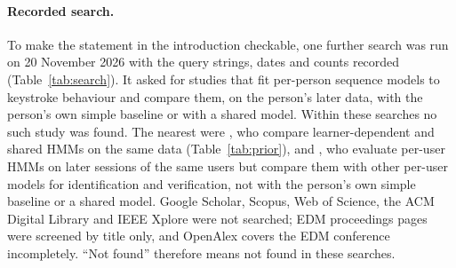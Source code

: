 \documentclass[10pt]{article}
\begin{document}
\paragraph{Recorded search.} To make the statement in the introduction checkable, one further search was run on 20 November 2026 with the query strings, dates and counts recorded (Table~\ref{tab:search}). It asked for studies that fit per-person sequence models to keystroke behaviour and compare them, on the person's later data, with the person's own simple baseline or with a shared model. Within these searches no such study was found. The nearest were \citet{Uto2020}, who compare learner-dependent and shared HMMs on the same data (Table~\ref{tab:prior}), and \citet{Monaco2018}, who evaluate per-user HMMs on later sessions of the same users but compare them with other per-user models for identification and verification, not with the person's own simple baseline or a shared model. Google Scholar, Scopus, Web of Science, the ACM Digital Library and IEEE Xplore were not searched; EDM proceedings pages were screened by title only, and OpenAlex covers the EDM conference incompletely. ``Not found'' therefore means not found in these searches.
\end{document}
